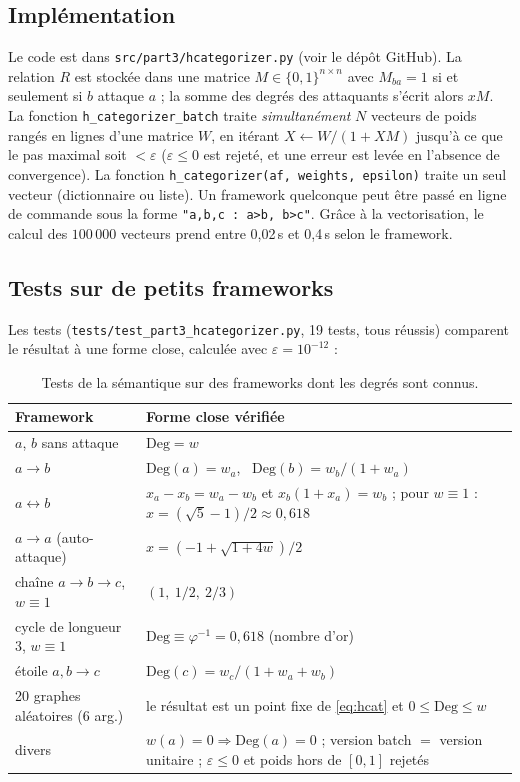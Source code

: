 \documentclass[10pt,a4paper]{article}
\theoremstyle{remark}
\newcommand{\Deg}{\mathrm{Deg}}
\begin{document}
\subsection{Implémentation}

Le code est dans \texttt{src/part3/hcategorizer.py} (voir le dépôt GitHub). La relation $R$ est
stockée dans une matrice $M\in\{0,1\}^{n\times n}$ avec $M_{ba}=1$ si et seulement si $b$ attaque $a$ ;
la somme des degrés des attaquants s'écrit alors $xM$. La fonction \texttt{h\_categorizer\_batch}
traite \emph{simultanément} $N$ vecteurs de poids rangés en lignes d'une matrice $W$, en itérant
$X\leftarrow W/(1+XM)$ jusqu'à ce que le pas maximal soit $<\varepsilon$ ($\varepsilon\le0$ est rejeté,
et une erreur est levée en l'absence de convergence). La fonction \texttt{h\_categorizer(af, weights, epsilon)}
traite un seul vecteur (dictionnaire ou liste). Un framework quelconque peut être passé en ligne de
commande sous la forme \texttt{"a,b,c : a>b, b>c"}. Grâce à la vectorisation, le calcul des
$100\,000$ vecteurs prend entre 0,02\,s et 0,4\,s selon le framework.

\subsection{Tests sur de petits frameworks}

Les tests (\texttt{tests/test\_part3\_hcategorizer.py}, 19 tests, tous réussis) comparent
le résultat à une forme close, calculée avec $\varepsilon=10^{-12}$ :

\begin{table}[H]
\centering\small
\begin{tabularx}{\linewidth}{lX}
\toprule
Framework & Forme close vérifiée \\
\midrule
$a$, $b$ sans attaque & $\Deg=w$ \\
$a\to b$ & $\Deg(a)=w_a$, \ $\Deg(b)=w_b/(1+w_a)$ \\
$a\leftrightarrow b$ & $x_a-x_b=w_a-w_b$ et $x_b(1+x_a)=w_b$ ; pour $w\equiv 1$ :
$x=(\sqrt5-1)/2\approx 0{,}618$ \\
$a\to a$ (auto-attaque) & $x=(-1+\sqrt{1+4w})/2$ \\
chaîne $a\to b\to c$, $w\equiv1$ & $(1,\ 1/2,\ 2/3)$ \\
cycle de longueur 3, $w\equiv1$ & $\Deg\equiv\varphi^{-1}=0{,}618$ (nombre d'or) \\
étoile $a,b\to c$ & $\Deg(c)=w_c/(1+w_a+w_b)$ \\
20 graphes aléatoires (6 arg.) & le résultat est un point fixe de \eqref{eq:hcat} et $0\le\Deg\le w$ \\
divers & $w(a)=0\Rightarrow\Deg(a)=0$ ; version batch $=$ version unitaire ;
$\varepsilon\le 0$ et poids hors de $[0,1]$ rejetés \\
\bottomrule
\end{tabularx}
\caption{Tests de la sémantique sur des frameworks dont les degrés sont connus.}
\end{table}
\end{document}
